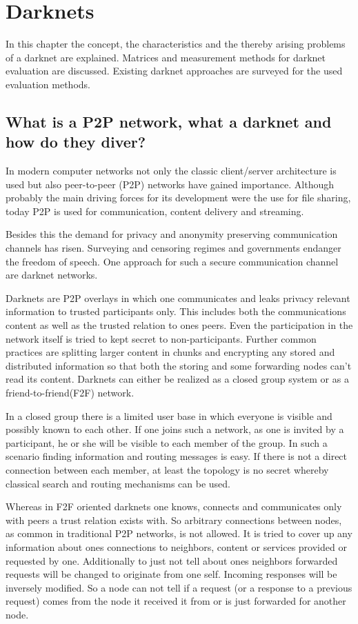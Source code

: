 \chapter{Darknets}

In this chapter the concept, the characteristics and the thereby arising problems of a darknet are explained. Matrices and measurement methods for darknet evaluation are discussed. Existing darknet approaches are surveyed for the used evaluation methods. 

\section{What is a P2P network, what a darknet and how do they diver?}

In modern computer networks not only the classic client/server architecture is used but also peer-to-peer (P2P) networks have gained importance. Although probably the main driving forces for its development were the use for file sharing, today P2P is used for communication, content delivery and streaming.

Besides this the demand for privacy and anonymity preserving communication channels has risen. Surveying and censoring regimes and governments endanger the freedom of speech. One approach for such a secure communication channel are darknet networks.

Darknets are P2P overlays in which one communicates and leaks privacy relevant information to trusted participants only. This includes both the communications content as well as the trusted relation to ones peers. Even the participation in the network itself is tried to kept secret to non-participants. Further common practices are splitting larger content in chunks and encrypting any stored and distributed information so that both the storing and some forwarding nodes can't read its content. Darknets can either be realized as a closed group system or as a friend-to-friend(F2F) network.

In a closed group there is a limited user base in which everyone is visible and possibly known to each other. If one joins such a network, as one is invited by a participant, he or she will be visible to each member of the group. In such a scenario finding information and routing messages is easy. If there is not a direct connection between each member, at least the topology is no secret whereby classical search and routing mechanisms can be used.

Whereas in F2F oriented darknets one knows, connects and communicates only with peers a trust relation exists with. So arbitrary connections between nodes, as common in traditional P2P networks, is not allowed. It is tried to cover up any information about ones connections to neighbors, content or services provided or requested by one. Additionally to just not tell about ones neighbors forwarded requests will be changed to originate from one self. Incoming responses will be inversely modified. So a node can not tell if a request (or a response to a previous request) comes from the node it received it from or is just forwarded for another node.

